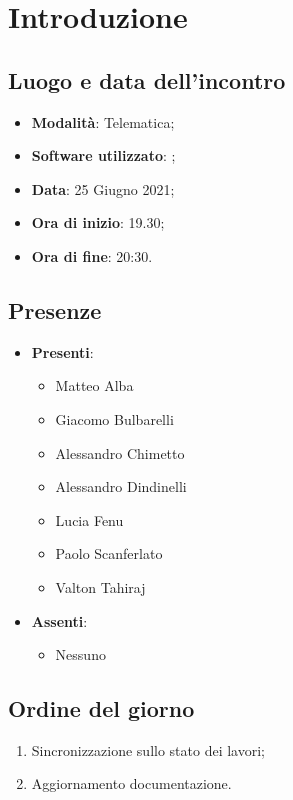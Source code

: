 \documentclass[]{article}
\begin{document}
	

	\newpage


		\section{Introduzione}
		\subsection{Luogo e data dell'incontro}
		\begin{itemize}
			\item \textbf{Modalità}: Telematica;
			\item \textbf{Software utilizzato}: ;
			\item \textbf{Data}: 25 Giugno 2021;
			\item \textbf{Ora di inizio}: 19.30;
			\item \textbf{Ora di fine}: 20:30.
		\end{itemize}

		\subsection{Presenze}
		\begin{itemize}
			\item \textbf{Presenti}:
			\begin{itemize}
				\item Matteo Alba
				\item Giacomo Bulbarelli
				\item Alessandro Chimetto
				\item Alessandro Dindinelli
				\item Lucia Fenu
				\item Paolo Scanferlato
				\item Valton Tahiraj
			\end{itemize}
			\item \textbf{Assenti}:
			\begin{itemize}
				\item Nessuno
			\end{itemize}
		\end{itemize}

		\subsection{Ordine del giorno}
		\begin{enumerate}
			\item Sincronizzazione sullo stato dei lavori;
			\item Aggiornamento documentazione.
		\end{enumerate}
\end{document}
